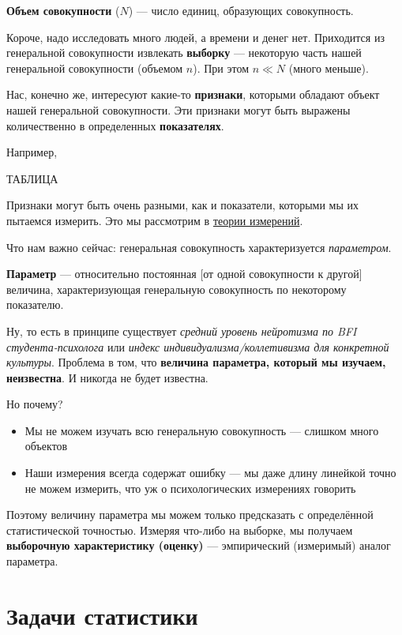 \documentclass[
  letterpaper,
]{scrbook}
\providecommand{\tightlist}{%
  \setlength{\itemsep}{0pt}\setlength{\parskip}{0pt}}\usepackage{longtable,booktabs,array}
\theoremstyle{definition}
\theoremstyle{remark}
\begin{document}
\textbf{Объем совокупности} (\(N\)) --- число единиц, образующих
совокупность.

Короче, надо исследовать много людей, а времени и денег нет. Приходится
из генеральной совокупности извлекать \textbf{выборку} --- некоторую
часть нашей генеральной совокупности (объемом \(n\)). При этом
\(n \ll N\) (много меньше).

Нас, конечно же, интересуют какие-то \textbf{признаки}, которыми
обладают объект нашей генеральной совокупности. Эти признаки могут быть
выражены количественно в определенных \textbf{показателях}.

Например,

ТАБЛИЦА

Признаки могут быть очень разными, как и показатели, которыми мы их
пытаемся измерить. Это мы рассмотрим в
\hyperref[measurements-social-sci]{теории измерений}.

Что нам важно сейчас: генеральная совокупность характеризуется
\emph{параметром}.

\textbf{Параметр} --- относительно постоянная {[}от одной совокупности к
другой{]} величина, характеризующая генеральную совокупность по
некоторому показателю.

Ну, то есть в принципе существует \emph{средний уровень нейротизма по
BFI студента-психолога} или \emph{индекс индивидуализма/коллетивизма для
конкретной культуры}. Проблема в том, что \textbf{величина параметра,
который мы изучаем, неизвестна}. И никогда не будет известна.

Но почему?

\begin{itemize}
\tightlist
\item
  Мы не можем изучать всю генеральную совокупность --- слишком много
  объектов
\item
  Наши измерения всегда содержат ошибку --- мы даже длину линейкой точно
  не можем измерить, что уж о психологических измерениях говорить
\end{itemize}

Поэтому величину параметра мы можем только предсказать с определённой
статистической точностью. Измеряя что-либо на выборке, мы получаем
\textbf{выборочную характеристику (оценку)} --- эмпирический (измеримый)
аналог параметра.

\section{Задачи статистики}\label{stats-goals}
\end{document}
